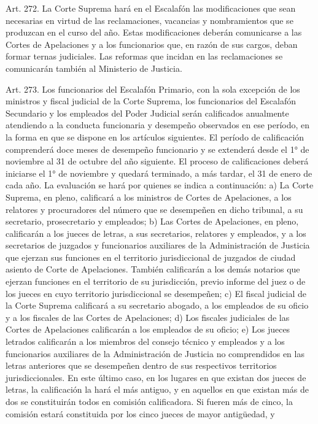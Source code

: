     Art. 272. La Corte Suprema hará en el Escalafón las modificaciones que sean necesarias en virtud de las reclamaciones, vacancias y nombramientos que se produzcan en el curso del año. Estas modificaciones deberán comunicarse a las Cortes de Apelaciones y a los funcionarios que, en razón de sus cargos, deban formar ternas judiciales.
    Las reformas que incidan en las reclamaciones se comunicarán también al Ministerio de Justicia.

    Art. 273. Los funcionarios del Escalafón Primario, con la sola excepción de los ministros y fiscal judicial de la Corte Suprema, los funcionarios del Escalafón Secundario y los empleados del Poder Judicial serán calificados anualmente atendiendo a la conducta funcionaria y desempeño observados en ese período, en la forma en que se dispone en los artículos siguientes.
    El período de calificación comprenderá doce meses de desempeño funcionario y se extenderá desde el 1° de noviembre al 31 de octubre del año siguiente.
    El proceso de calificaciones deberá iniciarse el 1° de noviembre y quedará terminado, a más tardar, el 31 de enero de cada año.
    La evaluación se hará por quienes se indica a continuación:
    a) La Corte Suprema, en pleno, calificará a los ministros de Cortes de Apelaciones, a los relatores y procuradores del número que se desempeñen en dicho tribunal, a su secretario, prosecretario y empleados;
    b) Las Cortes de Apelaciones, en pleno, calificarán a los jueces de letras, a sus secretarios, relatores y empleados, y a los secretarios de juzgados y funcionarios auxiliares de la Administración de Justicia que ejerzan sus funciones en el territorio jurisdiccional de juzgados de ciudad asiento de Corte de Apelaciones. También calificarán a los demás notarios que ejerzan funciones en el territorio de su jurisdicción, previo informe del juez o de los jueces en cuyo territorio jurisdiccional se desempeñen;
    c) El fiscal judicial de la Corte Suprema calificará a su secretario abogado, a los empleados de su oficio y a los fiscales de las Cortes de Apelaciones;
    d) Los fiscales judiciales de las Cortes de Apelaciones calificarán a los empleados de su oficio;
    e) Los jueces letrados calificarán a los miembros del consejo técnico y empleados y a los funcionarios auxiliares de la Administración de Justicia no comprendidos en las letras anteriores que se desempeñen dentro de sus respectivos territorios jurisdiccionales. En este último caso, en los lugares en que existan dos jueces de letras, la calificación la hará el más antiguo, y en aquellos en que existan más de dos se constituirán todos en comisión calificadora. Si fueren más de cinco, la comisión estará constituida por los cinco jueces de mayor antigüedad, y
